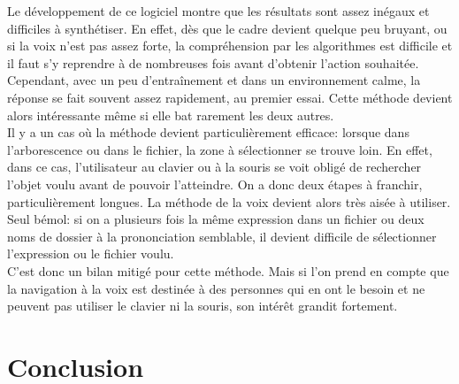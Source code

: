 \documentclass[a4paper, 11pt]{report}
\begin{document}
		Le développement de ce logiciel montre que les résultats sont assez inégaux et difficiles à synthétiser. En effet, dès que le cadre devient quelque peu bruyant, ou si la voix n'est pas assez forte, la compréhension par les algorithmes est difficile et il faut s'y reprendre à de nombreuses fois avant d'obtenir l'action souhaitée.\\
		Cependant, avec un peu d'entra\^inement et dans un environnement calme, la réponse se fait souvent assez rapidement, au premier essai. Cette méthode devient alors intéressante m\^eme si elle bat rarement les deux autres.\\
		Il y a un cas où la méthode devient particulièrement efficace: lorsque dans l'arborescence ou dans le fichier, la zone à sélectionner se trouve loin. En effet, dans ce cas, l'utilisateur au clavier ou à la souris se voit obligé de rechercher l'objet voulu avant de pouvoir l'atteindre. On a donc deux étapes à franchir, particulièrement longues. La méthode de la voix devient alors très aisée à utiliser.\\
		Seul bémol: si on a plusieurs fois la même expression dans un fichier ou deux noms de dossier à la prononciation semblable, il devient difficile de sélectionner l'expression ou le fichier voulu.\\
		C'est donc un bilan mitigé pour cette méthode. Mais si l'on prend en compte que la navigation à la voix est destinée à des personnes qui en ont le besoin et ne peuvent pas utiliser le clavier ni la souris, son intérêt grandit fortement.
		
		\chapter*{Conclusion}
	
	
	
	
	
	
		
	\newpage	
		
	\tableofcontents

		
\end{document}
